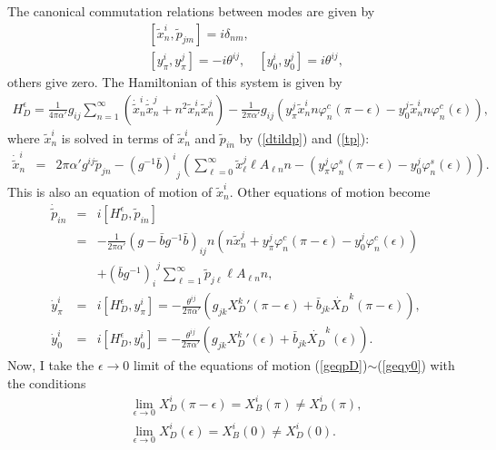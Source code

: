 \documentclass[a4paper,12pt]{article}
\newcommand{\nn}{\nonumber\\}
\newcommand{\co}{\varphi^c}
\newcommand{\si}{\varphi^s}
\newcommand{\e}{\epsilon}
\newcommand{\XB}{X_B}
\newcommand{\XD}{X_D}
\newcommand{\HD}{H_D^\epsilon}
\begin{document}
The canonical commutation relations between modes are
given by
\begin{eqnarray}
 \label{commD}
&&[\tilde{x}^i_n, \tilde{p}_{jm}]
=
i \delta_{nm}, \\
\label{commy}
&&[y^i_\pi, y^j_\pi] = - i \theta^{ij}, \quad
[y_0^i,y_0^j] = i \theta^{ij},
\end{eqnarray}
others give zero.
The Hamiltonian of this system
is given by
\begin{eqnarray}
 \label{HD}
\HD
=
\frac{1}{4\pi\alpha'}
g_{ij}
\sum_{n=1}^\infty
\left(
\dot{\tilde{x}}^i_n\dot{\tilde{x}}^j_n
+
n^2 \tilde{x}^i_n\tilde{x}^j_n
\right)
-
\frac{1}{2\pi\alpha'}
g_{ij}
\left(
y^j_\pi \tilde{x}^i_n n \co_n(\pi-\e)
-
y^j_0  \tilde{x}^i_n n \co_n(\e)
\right),
\end{eqnarray}
where $\tilde{x}^i_n$
is solved in terms of
$\tilde{x}^i_n$
and $\tilde{p}_{i n}$ by (\ref{dtildp}) and (\ref{tp}):
\begin{eqnarray}
 \label{geqxD}
\dot{\tilde{x}}^i_n
&=& 
 2\pi\alpha' g^{ij} \tilde{p}_{j n} 
-
{(g^{-1}\bar{b})^i}_{j}
 \left(
\sum_{\ell=0}^\infty \tilde{x}^j_\ell \ell A_{\ell n} n
-
  \left(
y^j_\pi
   \si_n(\pi-\e)
-y^j_0 
   \si_n(\e)
 \right)
\right).
\end{eqnarray}
This is also an equation of motion of $\tilde{x}^i_n$.
Other equations of motion become
\begin{eqnarray}
 \label{geqpD}
\dot{\tilde{p}}_{in} 
&=& i[\HD , \tilde{p}_{in}] \nn
&=& -\frac{1}{2\pi\alpha'} 
\left( g-\bar{b}g^{-1}\bar{b} \right)_{ij} 
n
\left(
n \tilde{x}^j_n + 
 y^j_\pi \co_n (\pi-\e)
-y^j_0  \co_n (\e)
\right)  \nn
&&+
{(\bar{b}g^{-1})_i}^j 
\sum_{\ell=1}^\infty
\tilde{p}_{j\ell} \ell A_{\ell n} n  , \label{geqypi}\\
\dot{y}_\pi^i 
&=& i [\HD, y^i_\pi]
= - \frac{\theta^{ij}}{2\pi\alpha'}
\left(
 g_{jk} {\XD^k}'(\pi-\e) + 
\bar{b}_{jk} \dot{\XD}^k(\pi-\e)
\right) , \\
 \label{geqy0}
\dot{y}_0^i 
&=& i [\HD, y^i_0]
= - \frac{\theta^{ij}}{2\pi\alpha'}
\left(
 g_{jk} {\XD^k}'(\e) + 
\bar{b}_{jk} \dot{\XD}^k(\e)
\right).
\end{eqnarray}
%
%
Now, I take the
$\e \rightarrow 0$ limit
of the equations of motion
(\ref{geqpD})$\sim$(\ref{geqy0})
with 
the conditions
\begin{eqnarray}
 \label{limitD}
&& \lim_{\e \rightarrow 0}
\XD^i (\pi-\e) = \XB^i(\pi) \ne \XD^i (\pi), \nn
&& \lim_{\e \rightarrow 0}
\XD^i (\e) = \XB^i(0) \ne \XD^i (0) .
\end{eqnarray}
\end{document}
